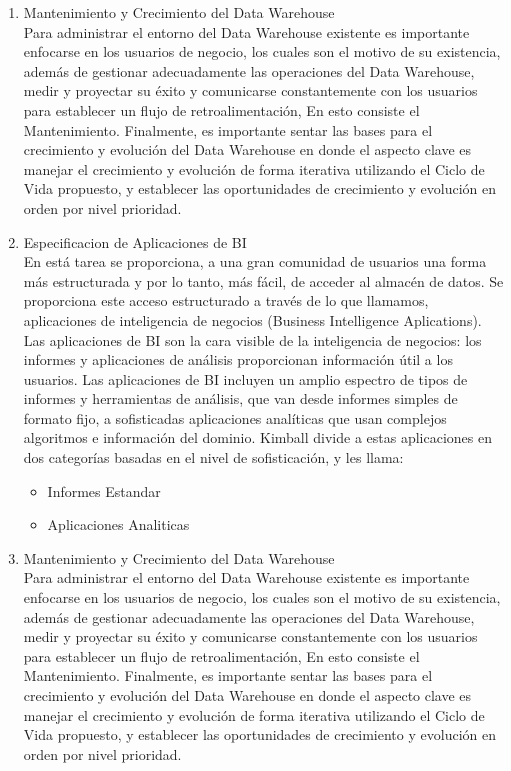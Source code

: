 \documentclass[preprint,12pt]{elsarticle}
\begin{document}
\begin{enumerate}[4.1]
\item Mantenimiento y Crecimiento del Data Warehouse \\

Para administrar el entorno del Data Warehouse existente es importante enfocarse en los usuarios de negocio, los cuales son el motivo de su existencia, además de gestionar adecuadamente las operaciones del Data Warehouse, medir y proyectar su éxito y comunicarse constantemente con los usuarios para establecer un flujo de retroalimentación, En esto consiste el Mantenimiento. Finalmente, es importante sentar las bases para el crecimiento y evolución del Data Warehouse en donde el aspecto clave es manejar el crecimiento y evolución de forma iterativa utilizando el Ciclo de Vida propuesto, y establecer las oportunidades de crecimiento y evolución en orden por nivel prioridad.

\item Especificacion de Aplicaciones de BI \\

En está tarea se proporciona, a una gran comunidad de usuarios una forma más estructurada y por lo tanto, más fácil, de acceder al almacén de datos. Se proporciona este acceso estructurado a través de lo que llamamos, aplicaciones de inteligencia de negocios (Business Intelligence Aplications). Las aplicaciones de BI son la cara visible de la inteligencia de negocios: los informes y aplicaciones de análisis proporcionan información útil a los usuarios. Las aplicaciones de BI incluyen un amplio espectro de tipos de informes y herramientas de análisis, que van desde informes simples de formato fijo, a sofisticadas aplicaciones analíticas que usan complejos algoritmos e información del dominio. Kimball divide a estas aplicaciones en dos categorías basadas en el nivel de sofisticación, y les llama:\\

\begin{itemize}
  \item Informes Estandar\\
  \item Aplicaciones Analiticas
\\


\end{itemize} 

\item Mantenimiento y Crecimiento del Data Warehouse \\

Para administrar el entorno del Data Warehouse existente es importante enfocarse en los usuarios de negocio, los cuales son el motivo de su existencia, además de gestionar adecuadamente las operaciones del Data Warehouse, medir y proyectar su éxito y comunicarse constantemente con los usuarios para establecer un flujo de retroalimentación, En esto consiste el Mantenimiento. Finalmente, es importante sentar las bases para el crecimiento y evolución del Data Warehouse en donde el aspecto clave es manejar el crecimiento y evolución de forma iterativa utilizando el Ciclo de Vida propuesto, y establecer las oportunidades de crecimiento y evolución en orden por nivel prioridad.\\



\end{enumerate}
\end{document}
